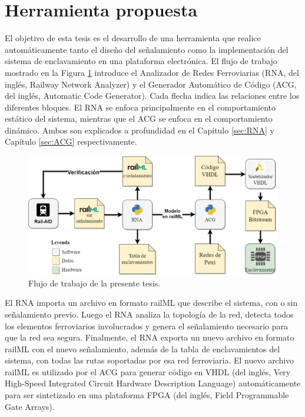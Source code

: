 \section{Herramienta propuesta}

    El objetivo de esta tesis es el desarrollo de una herramienta que realice automáticamente tanto el diseño del señalamiento como la implementación del sistema de enclavamiento en una plataforma electrónica. El flujo de trabajo mostrado en la Figura \ref{fig:workflow} introduce el Analizador de Redes Ferroviarias (RNA, del inglés, Railway Network Analyzer) y el Generador Automático de Código (ACG, del inglés, Automatic Code Generator). Cada flecha indica las relaciones entre los diferentes bloques. El RNA se enfoca principalmente en el comportamiento estático del sistema, mientras que el ACG se enfoca en el comportamiento dinámico. Ambos son explicados a profundidad en el Capítulo \ref{sec:RNA} y Capítulo \ref{sec:ACG} respectivamente.

    \begin{figure}[h]
        \centering
        \includegraphics[width=1\textwidth]{Figuras/workflow.png}
        \centering\caption{Flujo de trabajo de la presente tesis.}
        \label{fig:workflow}
    \end{figure}

    El RNA importa un archivo en formato railML que describe el sistema, con o sin señalamiento previo. Luego el RNA analiza la topología de la red, detecta todos los elementos ferroviarios involucrados y genera el señalamiento necesario para que la red sea segura. Finalmente, el RNA exporta un nuevo archivo en formato railML con el nuevo señalamiento, además de la tabla de enclavamientos del sistema, con todas las rutas soportadas por esa red ferroviaria. El nuevo archivo railML es utilizado por el ACG para generar código en VHDL \cite{Paper_206} (del inglés, Very High-Speed Integrated Circuit Hardware Description Language) automáticamente para ser sintetizado en una plataforma FPGA \cite{Paper_8,Paper_25,Paper_34,Paper_46,Paper_49} (del inglés, Field Programmable Gate Arrays).
    
